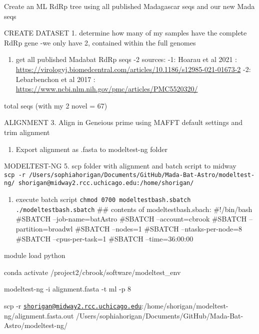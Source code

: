 \documentclass[
]{article}
\providecommand{\tightlist}{%
  \setlength{\itemsep}{0pt}\setlength{\parskip}{0pt}}
\begin{document}
Create an ML RdRp tree using all published Madagascar seqs and our new
Mada seqs

CREATE DATASET 1. determine how many of my samples have the complete
RdRp gene -we only have 2, contained within the full genomes

\begin{enumerate}
\def\labelenumi{\arabic{enumi}.}
\setcounter{enumi}{1}
\tightlist
\item
  get all published Madabat RdRp seqs -2 sources: -1: Hoarau et al 2021
  :
  \url{https://virologyj.biomedcentral.com/articles/10.1186/s12985-021-01673-2}
  -2: Lebarbenchon et al 2017 :
  \url{https://www.ncbi.nlm.nih.gov/pmc/articles/PMC5520320/}
\end{enumerate}

total seqs (with my 2 novel = 67)

ALIGNMENT 3. Align in Geneious prime using MAFFT default settings and
trim alignment

\begin{enumerate}
\def\labelenumi{\arabic{enumi}.}
\setcounter{enumi}{3}
\tightlist
\item
  Export alignment as .fasta to modeltest-ng folder
\end{enumerate}

MODELTEST-NG 5. scp folder with alignment and batch script to midway
\texttt{scp\ -r\ /Users/sophiahorigan/Documents/GitHub/Mada-Bat-Astro/modeltest-ng/\ shorigan@midway2.rcc.uchicago.edu:/home/shorigan/}

\begin{enumerate}
\def\labelenumi{\arabic{enumi}.}
\setcounter{enumi}{5}
\tightlist
\item
  execute batch script \texttt{chmod\ 0700\ modeltestbash.sbatch}
  \texttt{./modeltestbash.sbatch} \#\# contents of modeltestbash.sbach:
  \#!/bin/bash \#SBATCH --job-name=batAstro \#SBATCH --account=cbrook
  \#SBATCH --partition=broadwl \#SBATCH --nodes=1 \#SBATCH
  --ntasks-per-node=8 \#SBATCH --cpus-per-task=1 \#SBATCH
  --time=36:00:00
\end{enumerate}

module load python

conda activate /project2/cbrook/software/modeltest\_env

modeltest-ng -i alignment.fasta -t ml -p 8

scp -r
\href{mailto:shorigan@midway2.rcc.uchicago.edu}{\nolinkurl{shorigan@midway2.rcc.uchicago.edu}}:/home/shorigan/modeltest-ng/alignment.fasta.out
/Users/sophiahorigan/Documents/GitHub/Mada-Bat-Astro/modeltest-ng/
\end{document}
